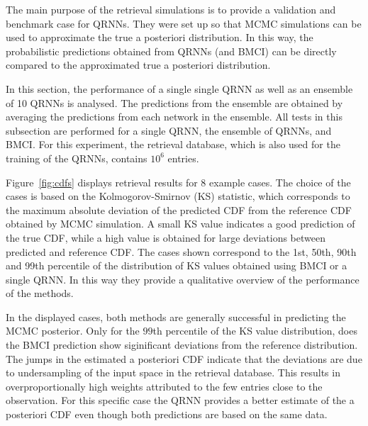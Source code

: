 \documentclass[journal abbreviation, manuscript]{copernicus}
\begin{document}
  The main purpose of the retrieval simulations is to provide a validation
  and benchmark case for QRNNs. They were set up so that MCMC simulations
  can be used to approximate the true a posteriori distribution. In this way,
  the probabilistic predictions obtained from QRNNs (and BMCI) can be directly
  compared to the approximated true a posteriori distribution.

  In this section, the performance of a single single QRNN as well as an
  ensemble of 10 QRNNs is analysed. The predictions from the ensemble are obtained
  by averaging the predictions from each network in the ensemble. All tests in
  this subsection are performed for a single QRNN, the ensemble of QRNNs, and
  BMCI. For this experiment, the retrieval database, which is also used for the
  training of the QRNNs, contains $10^6$ entries.

    Figure~\ref{fig:cdfs} displays retrieval results for 8 example cases. The
choice of the cases is based on the Kolmogorov-Smirnov (KS) statistic, which
corresponds to the maximum absolute deviation of the predicted CDF from the
reference CDF obtained by MCMC simulation. A small KS value indicates a good
prediction of the true CDF, while a high value is obtained for large deviations
between predicted and reference CDF. The cases shown correspond to the 1st, 50th,
 90th and 99th percentile of the distribution of KS values obtained using BMCI
or a single QRNN. In this way they provide a qualitative overview of the performance
of the methods.

In the displayed cases, both methods are generally successful in predicting the
MCMC posterior. Only for the $99$th percentile of the KS value distribution,
does the BMCI prediction show siginificant deviations from the reference distribution.
 The jumps in the estimated a posteriori CDF indicate that the deviations are due to
undersampling of the input space in the retrieval database. This results in
overproportionally high weights attributed to the few entries close to the
observation. For this specific case the QRNN provides a better estimate of the a
posteriori CDF even though both predictions are based on the same data.
\end{document}
